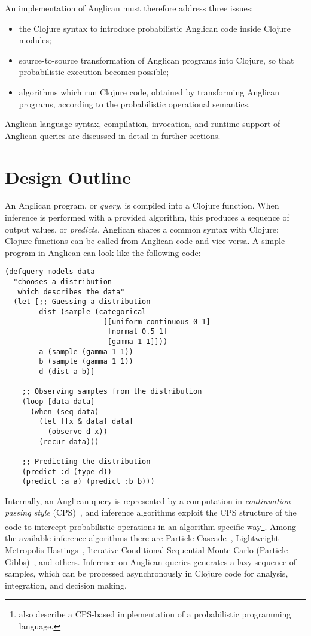 \documentclass[preprint]{sigplanconf}
\begin{document}
An implementation of Anglican must therefore address three issues:
\begin{itemize}
    \item the Clojure syntax to introduce probabilistic Anglican
        code inside Clojure modules;
    \item source-to-source transformation of Anglican programs
        into Clojure, so that probabilistic execution becomes
        possible;
    \item algorithms which run Clojure code, obtained by
        transforming Anglican programs, according to the
        probabilistic operational semantics.
\end{itemize}

Anglican language syntax, compilation, invocation, and runtime
support of Anglican queries are discussed in detail in further
sections.

\section{Design Outline}

An Anglican program, or \textit{query}, is compiled into a Clojure
function. When inference is performed with a provided algorithm, this
produces a sequence of output values, or \textit{predicts}. Anglican
shares a common syntax with Clojure; Clojure functions can be called
from Anglican code and vice versa. A simple program in Anglican can
look like the following code:
\begin{lstlisting}[style=default]
(defquery models data
  "chooses a distribution
   which describes the data"
  (let [;; Guessing a distribution
        dist (sample (categorical
                       [[uniform-continuous 0 1]
                        [normal 0.5 1] 
                        [gamma 1 1]]))
        a (sample (gamma 1 1))
        b (sample (gamma 1 1))
        d (dist a b)]

    ;; Observing samples from the distribution
    (loop [data data]
      (when (seq data)
        (let [[x & data] data]
          (observe d x))
        (recur data)))

    ;; Predicting the distribution
    (predict :d (type d))
    (predict :a a) (predict :b b)))
\end{lstlisting}

Internally, an Anglican query is represented by a computation in
\textit{continuation passing style} (CPS)~\cite{AJ89}, and inference algorithms
exploit the CPS structure of the code to intercept probabilistic
operations in an algorithm-specific way\footnote{\cite{GS15}
also describe a CPS-based implementation of a probabilistic
programming language.}. Among the available
inference algorithms there are Particle Cascade~\cite{PWD+14},
Lightweight Metropolis-Hastings~\cite{WSG11}, Iterative Conditional
Sequential Monte-Carlo (Particle Gibbs)~\cite{WVM14}, and others.
Inference on Anglican queries generates a lazy sequence of
samples, which can be processed asynchronously in Clojure
code for analysis, integration, and decision making.
\end{document}
